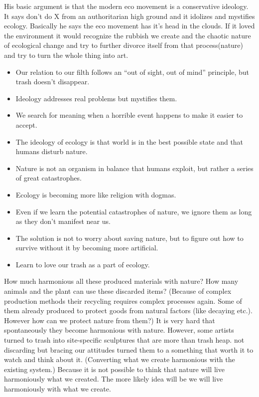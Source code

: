\documentclass[12pt]{article}
\begin{document}
His basic argument is that the modern eco movement is a conservative ideology. It says don't do X from an authoritarian high ground and it idolizes and mystifies ecology. Basically he says the eco movement has it's head in the clouds. If it loved the environment it would recognize the rubbish we create and the chaotic nature of ecological change and try to further divorce itself from that process(nature) and try to turn the whole thing into art. 

\begin{itemize}
\item Our relation to our filth follows an “out of sight, out of mind” principle, but trash doesn’t disappear.
\item Ideology addresses real problems but mystifies them.
\item We search for meaning when a horrible event happens to make it easier to accept.
\item The ideology of ecology is that world is in the best possible state and that humans disturb nature.
\item Nature is not an organism in balance that humans exploit, but rather a series of great catastrophes.
\item Ecology is becoming more like religion with dogmas.
\item Even if we learn the potential catastrophes of nature, we ignore them as long as they don’t manifest near us.
\item The solution is not to worry about saving nature, but to figure out how to survive without it by becoming more artificial.
\item Learn to love our trash as a part of ecology.
\end{itemize}	

How much harmonious all these produced materials with nature? How many animals and the plant can use these discarded items? (Because of complex production methods their recycling requires complex processes again. Some of them already produced to protect goods from natural factors (like decaying etc.). However how can we protect nature from them?) It is very hard that spontaneously they become harmonious with nature. However, some artists turned to trash into site-specific sculptures that are more than trash heap. not discarding but bracing our attitudes turned them to a something that worth it to watch and think about it. (Converting what we create harmonious with the existing system.) Because it is not possible to think that nature will live harmoniously what we created. The more likely idea will be we will live harmoniously with what we create.
\end{document}
